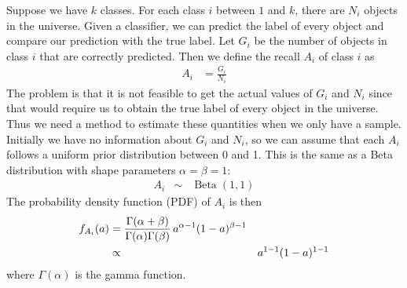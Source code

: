 \documentclass[fleqn,10pt,lineno]{wlpeerj} %
\DeclareMathOperator{\Beta}{Beta}
\begin{document}
Suppose we have $k$ classes. For each class $i$ between $1$ and $k$, there are
$N_i$ objects in the universe. Given a classifier, we can predict the label of
every object and compare our prediction with the true label. Let $G_i$ be the
number of objects in class $i$ that are correctly predicted.
Then we define the recall $A_i$ of class $i$ as
	\begin{align}
		A_i &= \frac{G_i}{N_i}
	\end{align}
The problem is that it is not feasible to get the actual values of $G_i$ and
$N_i$ since that would require us to obtain the true label of every object in
the universe. Thus we need a method to estimate these quantities when we only
have a sample. Initially we have no information about $G_i$ and $N_i$, so we
can assume that each $A_i$ follows a uniform prior distribution between 0 and
1. This is the same as a Beta distribution with shape parameters $\alpha =
\beta = 1$:
	\begin{align}
		A_i &\sim& \Beta(1,1)
	\end{align}
The probability density function (PDF) of $A_i$ is then
    \begin{align}
        f_{A_i}(a) &= \frac{\Gamma(\alpha+\beta)}{\Gamma(\alpha)\Gamma(\beta)}\,
        a^{\alpha-1}(1-a)^{\beta-1} \label{eqn:prior} \\
        &\propto&   a^{1-1}(1-a)^{1-1}  \notag
    \end{align}
where $\Gamma(\alpha)$ is the gamma function.
\end{document}
